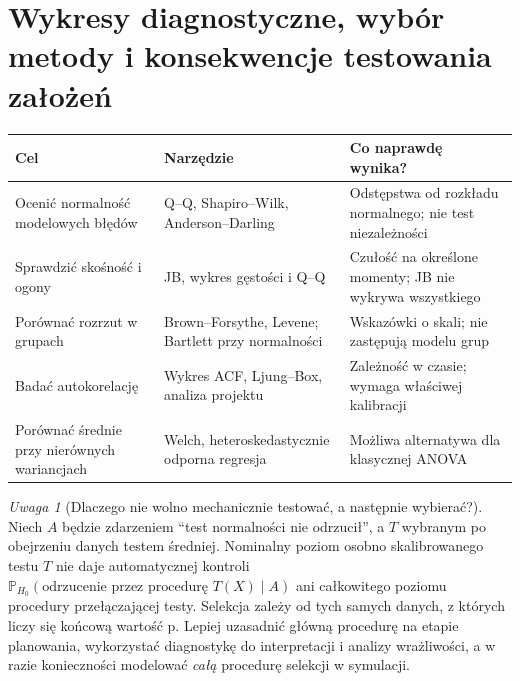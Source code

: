 \documentclass[11pt,a4paper,oneside]{report}
\numberwithin{equation}{chapter}
\theoremstyle{plain}
\theoremstyle{definition}
\theoremstyle{remark}
\newtheorem{uwaga}{Uwaga}[chapter]
\newcommand{\Prob}{\mathbb P}
\begin{document}
\section{Wykresy diagnostyczne, wybór metody i konsekwencje testowania założeń}
\begin{center}
\end{center}

\begin{center}\small
\begin{tabular}{>{\raggedright\arraybackslash}p{}>{\raggedright\arraybackslash}p{}>{\raggedright\arraybackslash}p{}}
\toprule
\textbf{Cel} & \textbf{Narzędzie} & \textbf{Co naprawdę wynika?}\\
\midrule
Ocenić normalność modelowych błędów & Q--Q, Shapiro--Wilk, Anderson--Darling & Odstępstwa od rozkładu normalnego; nie test niezależności\\
Sprawdzić skośność i ogony & JB, wykres gęstości i Q--Q & Czułość na określone momenty; JB nie wykrywa wszystkiego\\
Porównać rozrzut w grupach & Brown--Forsythe, Levene; Bartlett przy normalności & Wskazówki o skali; nie zastępują modelu grup\\
Badać autokorelację & Wykres ACF, Ljung--Box, analiza projektu & Zależność w czasie; wymaga właściwej kalibracji\\
Porównać średnie przy nierównych wariancjach & Welch, heteroskedastycznie odporna regresja & Możliwa alternatywa dla klasycznej ANOVA\\
\bottomrule
\end{tabular}
\end{center}

\begin{uwaga}[Dlaczego nie wolno mechanicznie testować, a następnie wybierać?]\label{rem:pretest}
Niech $A$ będzie zdarzeniem ``test normalności nie odrzucił'', a $T$ wybranym po obejrzeniu danych testem średniej. Nominalny poziom osobno skalibrowanego testu $T$ nie daje automatycznej kontroli $\Prob_{H_0}(\text{odrzucenie przez procedurę }T(X)\mid A)$ ani całkowitego poziomu procedury przełączającej testy. Selekcja zależy od tych samych danych, z których liczy się końcową wartość p. Lepiej uzasadnić główną procedurę na etapie planowania, wykorzystać diagnostykę do interpretacji i analizy wrażliwości, a w razie konieczności modelować \emph{całą} procedurę selekcji w symulacji.
\end{uwaga}
\end{document}
